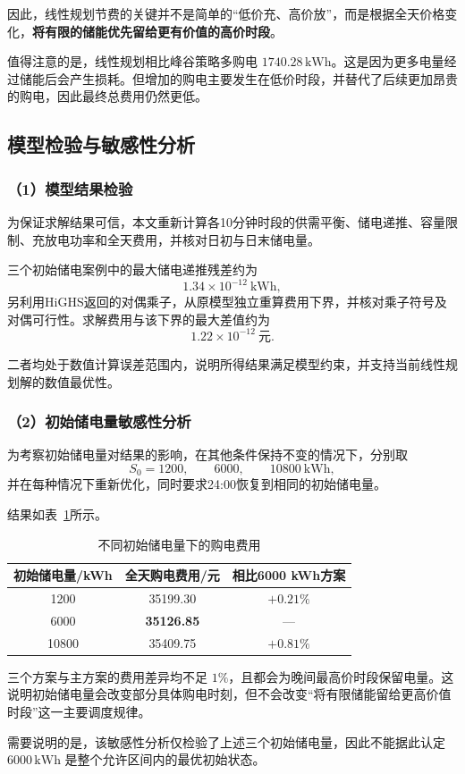 因此，线性规划节费的关键并不是简单的“低价充、高价放”，而是根据全天价格变化，\textbf{将有限的储能优先留给更有价值的高价时段}。

值得注意的是，线性规划相比峰谷策略多购电 \(1740.28\,\mathrm{kWh}\)。这是因为更多电量经过储能后会产生损耗。但增加的购电主要发生在低价时段，并替代了后续更加昂贵的购电，因此最终总费用仍然更低。

\subsection{模型检验与敏感性分析}

\subsubsection*{（1）模型结果检验}

为保证求解结果可信，本文重新计算各10分钟时段的供需平衡、储电递推、容量限制、充放电功率和全天费用，并核对日初与日末储电量。

三个初始储电案例中的最大储电递推残差约为
\[
1.34\times10^{-12}\ \mathrm{kWh},
\]
另利用HiGHS返回的对偶乘子，从原模型独立重算费用下界，并核对乘子符号及对偶可行性。求解费用与该下界的最大差值约为
\[
1.22\times10^{-12}\ \text{元}.
\]

二者均处于数值计算误差范围内，说明所得结果满足模型约束，并支持当前线性规划解的数值最优性。

\subsubsection*{（2）初始储电量敏感性分析}

为考察初始储电量对结果的影响，在其他条件保持不变的情况下，分别取
\[
S_0=1200,\qquad 6000,\qquad 10800\ \mathrm{kWh},
\]
并在每种情况下重新优化，同时要求24:00恢复到相同的初始储电量。

结果如表~\ref{tab:q1_sensitivity}所示。

\begin{table}[H]
    \centering
    \caption{不同初始储电量下的购电费用}
    \label{tab:q1_sensitivity}
    \begin{tabular}{ccc}
        \toprule
        初始储电量/kWh & 全天购电费用/元 & 相比6000 kWh方案 \\
        \midrule
        1200 & 35199.30 & $+0.21\%$ \\
        6000 & \textbf{35126.85} & --- \\
        10800 & 35409.75 & $+0.81\%$ \\
        \bottomrule
    \end{tabular}
\end{table}

三个方案与主方案的费用差异均不足 \(1\%\)，且都会为晚间最高价时段保留电量。这说明初始储电量会改变部分具体购电时刻，但不会改变“将有限储能留给更高价值时段”这一主要调度规律。

需要说明的是，该敏感性分析仅检验了上述三个初始储电量，因此不能据此认定 \(6000\,\mathrm{kWh}\) 是整个允许区间内的最优初始状态。
